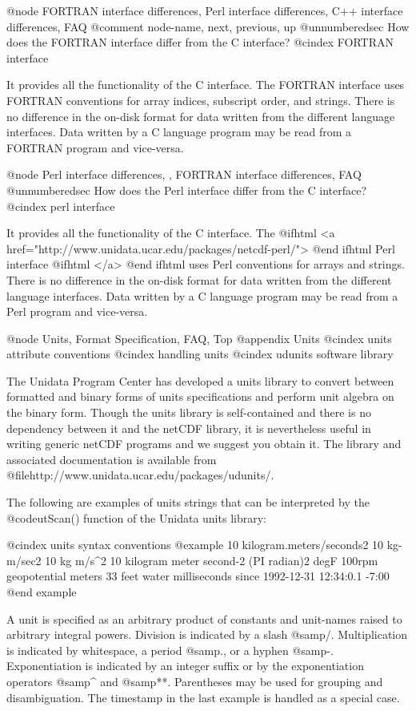 {@node FORTRAN interface differences, Perl interface differences, C++ interface differences, FAQ
@comment  node-name,  next,  previous,  up
@unnumberedsec How does the FORTRAN interface differ from the C interface?
@cindex FORTRAN interface

It provides all the functionality of the C interface.  The FORTRAN
interface uses FORTRAN conventions for array indices, subscript order,
and strings.  There is no difference in the on-disk format for data
written from the different language interfaces.  Data written by a C
language program may be read from a FORTRAN program and vice-versa.

@node Perl interface differences,  , FORTRAN interface differences, FAQ
@unnumberedsec How does the Perl interface differ from the C interface?
@cindex perl interface

It provides all the functionality of the C interface.  The 
@ifhtml
<a href="http://www.unidata.ucar.edu/packages/netcdf-perl/">
@end ifhtml
Perl interface 
@ifhtml
</a>
@end ifhtml
uses Perl conventions for arrays and strings.  There is no
difference in the on-disk format for data written from the different
language interfaces.  Data written by a C language program may be read
from a Perl program and vice-versa.


@node Units, Format Specification, FAQ, Top
@appendix Units
@cindex units attribute conventions
@cindex handling units
@cindex udunits software library

The Unidata Program Center has developed a units library to
convert between
formatted and binary forms of units specifications and perform unit
algebra on the binary form.
Though the units library is self-contained and there is no dependency
between it and the netCDF library, it is nevertheless useful in writing
generic netCDF programs and we suggest you obtain it.
The library and associated documentation is
available from
@file{http://www.unidata.ucar.edu/packages/udunits/}.

The following are examples of units strings that can be interpreted by
the @code{utScan()} function of the Unidata units library:

@cindex units syntax conventions
@example
10 kilogram.meters/seconds2
10 kg-m/sec2
10 kg m/s^2
10 kilogram meter second-2
(PI radian)2
degF
100rpm
geopotential meters
33 feet water
milliseconds since 1992-12-31 12:34:0.1 -7:00
@end example

A unit is specified as an arbitrary product of constants and unit-names
raised to arbitrary integral powers.  Division is indicated by a slash
@samp{/}.  Multiplication is indicated by whitespace, a period @samp{.},
or a hyphen @samp{-}.  Exponentiation is indicated by an integer suffix
or by the exponentiation operators @samp{^} and @samp{**}.  Parentheses
may be used for grouping and disambiguation.  The timestamp in the last
example is handled as a special case.

}
